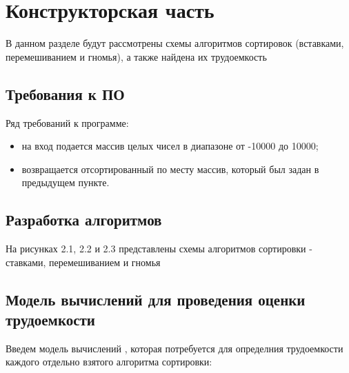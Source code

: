 \chapter{Конструкторская часть}
В данном разделе будут рассмотрены схемы алгоритмов сортировок (вставками, перемешиванием и гномья), а также найдена их трудоемкость

\section{Требования к ПО}
Ряд требований к программе:
\begin{itemize}
	\item на вход подается массив целых чисел в диапазоне от -10000 до 10000;
    \item возвращается отсортированный по месту массив, который был задан в предыдущем пункте. \newline
\end{itemize}

\section{Разработка алгоритмов}
На рисунках 2.1, 2.2 и 2.3 представлены схемы алгоритмов сортировки - ставками, перемешиванием и гномья


\clearpage

\section{Модель вычислений для проведения оценки трудоемкости}
Введем модель вычислений \cite{model}, которая потребуется для определния трудоемкости каждого отдельно взятого алгоритма сортировки:

